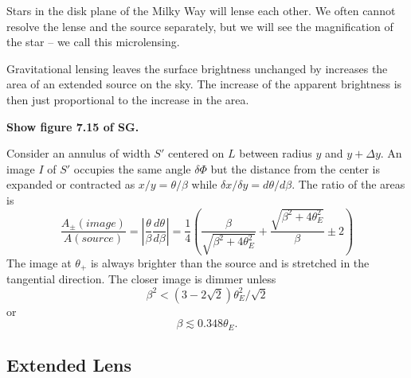\documentclass[]{article}
\begin{document}
Stars in the disk plane of the Milky Way will lense each other.  We
often cannot resolve the lense and the source separately, but we will
see the magnification of the star -- we call this microlensing.

Gravitational lensing leaves the surface brightness unchanged by increases
the area of an extended source on the sky.  The increase of the apparent
brightness is then just proportional to the increase in the area.

{\bf Show figure 7.15 of SG.}

Consider an annulus of width $S'$ centered on $L$ between
radius $y$ and $y+\Delta y$.  An image $I$ of
$S'$ occupies the same angle $\delta \Phi$ but the distance
from the center is expanded or contracted as $x/y = \theta/\beta$
while $\delta x/\delta y= d\theta/d\beta$.  The ratio of the areas
is 
\begin{equation}
\frac{A_{\pm}(image)}{A(source)} = \left| \frac{\theta}{\beta}\frac{d\theta}{d\beta}\right| = \frac{1}{4}\left( \frac{\beta}{\sqrt{\beta^2 + 4 \theta_E^2}} + \frac{\sqrt{\beta^2 + 4 \theta_E^2}}{\beta}\pm 2 \right)
\end{equation}
\noindent
The image at $\theta_{+}$ is always brighter than the source and is stretched in the
tangential direction.  The closer image is dimmer unless
\begin{equation}
\beta^2 < (3-2\sqrt{2})\theta_E^2 / \sqrt{2}
\end{equation}
\noindent
or
\begin{equation}
\beta \lesssim 0.348 \theta_E.
\end{equation}

\subsection{Extended Lens}
\end{document}
